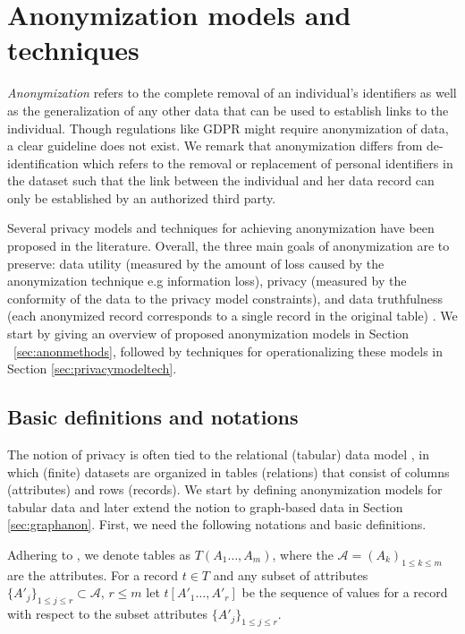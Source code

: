 \documentclass{bioinfo}
\begin{document}
% 

\section{Anonymization models and techniques}
\label{sec:anonmodeltech}
\emph{Anonymization} refers to the complete removal of an individual's identifiers as well as the generalization of any other data that can be used to establish links to the individual. Though regulations like GDPR might require anonymization of data, a clear guideline does not exist. We remark that anonymization differs from de-identification which refers to the removal or replacement of  personal identifiers in the dataset such that the link between the individual and her data record can only be established by an authorized third party. 

Several privacy models and techniques for achieving anonymization have been proposed in the literature. Overall, the three main goals of anonymization are to preserve: data utility (measured by the amount of loss caused by the anonymization technique e.g information loss), privacy (measured by the conformity of the data to the privacy model constraints), and data truthfulness (each anonymized record corresponds to a single record in the original table) \cite{cite211fung2010introduction}. We start by giving an overview of proposed anonymization models in Section ~\ref{sec:anonmethods}, followed by techniques for operationalizing these models in Section \ref{sec:privacymodeltech}.


\subsection{Basic definitions and notations} 
The notion of privacy is often tied to the relational (tabular) data model \cite{cite211fung2010introduction}, in which (finite) datasets are organized in tables (relations) that consist of columns (attributes) and rows (records). We start by defining anonymization models for tabular data and later extend the notion to graph-based data in Section \ref{sec:graphanon}. First, we need the following notations and basic definitions.

Adhering to \cite{sweeney2000simple}, we denote tables as ${T}(A_1\dots,A_m)$, where the $\mathcal{A}=(A_k)_{1\leq k \leq m}$ are the attributes. For a record $t\in T$ and any subset of attributes $\{A'_j\}_{1 \leq j \leq r} \subset \mathcal{A}$, $r\leq m$ let $t[A'_1\dots,A'_r]$ be the sequence of values for a record with respect to the subset attributes $\{A'_j\}_{1 \leq j \leq r}$.
\end{document}
